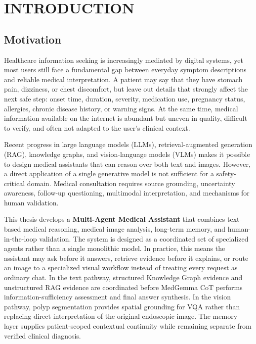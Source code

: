 \chapter{INTRODUCTION}

\section{Motivation}

Healthcare information seeking is increasingly mediated by digital systems, yet most users still face a fundamental gap between everyday symptom descriptions and reliable medical interpretation. A patient may say that they have stomach pain, dizziness, or chest discomfort, but leave out details that strongly affect the next safe step: onset time, duration, severity, medication use, pregnancy status, allergies, chronic disease history, or warning signs. At the same time, medical information available on the internet is abundant but uneven in quality, difficult to verify, and often not adapted to the user's clinical context.

Recent progress in large language models (LLMs), retrieval-augmented generation (RAG), knowledge graphs, and vision-language models (VLMs) makes it possible to design medical assistants that can reason over both text and images. However, a direct application of a single generative model is not sufficient for a safety-critical domain. Medical consultation requires source grounding, uncertainty awareness, follow-up questioning, multimodal interpretation, and mechanisms for human validation.

This thesis develops a \textbf{Multi-Agent Medical Assistant} that combines text-based medical reasoning, medical image analysis, long-term memory, and human-in-the-loop validation. The system is designed as a coordinated set of specialized agents rather than a single monolithic model. In practice, this means the assistant may ask before it answers, retrieve evidence before it explains, or route an image to a specialized visual workflow instead of treating every request as ordinary chat. In the text pathway, structured Knowledge Graph evidence and unstructured RAG evidence are coordinated before MedGemma CoT performs information-sufficiency assessment and final answer synthesis. In the vision pathway, polyp segmentation provides spatial grounding for VQA rather than replacing direct interpretation of the original endoscopic image. The memory layer supplies patient-scoped contextual continuity while remaining separate from verified clinical diagnosis.

